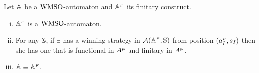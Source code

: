 \begin{proposition}\label{PROP_facts_finConstrwmso} Let $\mathbb{A}$ be a $\mathrm{WMSO}$-automaton and $\mathbb{A}^{{\scriptscriptstyle F}}$ its finitary construct.
\begin{enumerate}[(i)]
   pt
  \item $\mathbb{A}^{{\scriptscriptstyle F}}$ is a $\mathrm{WMSO}$-automaton.\label{point:finConstrAut}
  \item For any $\mathbb{S}$, if $\exists$ has a winning strategy in $\mathcal{A}(\mathbb{A}^{{\scriptscriptstyle F}},\mathbb{S})$ from position $(a_I^{{\scriptscriptstyle F}},s_I)$ then she has one that is functional in $A^{\wp}$ and finitary in $A^{\wp}$.%
  \label{point:finConstrStrategy}
  \item $\mathbb{A} \equiv \mathbb{A}^{{\scriptscriptstyle F}}$. \label{point:finConstrEquiv}
  \end{enumerate}
\end{proposition}
